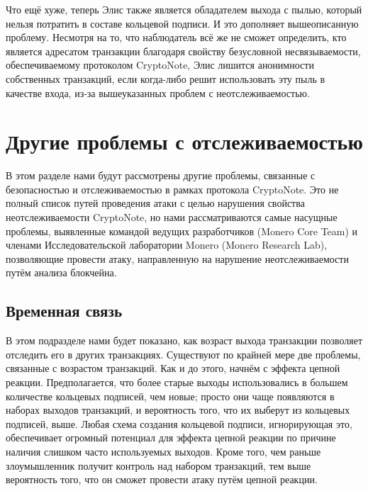 \documentclass{mrl}
\begin{document}
Что ещё хуже, теперь Элис также является обладателем выхода с пылью, который нельзя потратить в составе кольцевой подписи. И это дополняет вышеописанную проблему. Несмотря на то, что наблюдатель всё же не сможет определить, кто является адресатом транзакции благодаря свойству безусловной несвязываемости, обеспечиваемому протоколом CryptoNote, Элис лишится анонимности собственных транзакций, если когда-либо решит использовать эту пыль в качестве входа, из-за вышеуказанных проблем с неотслеживаемостью.

\section{Другие проблемы с отслеживаемостью}\label{moreIssues}
В этом разделе нами будут рассмотрены другие проблемы, связанные с безопасностью и отслеживаемостью в рамках протокола CryptoNote. Это не полный список путей проведения атаки с целью нарушения свойства неотслеживаемости CryptoNote, но нами рассматриваются самые насущные проблемы, выявленные командой ведущих разработчиков (Monero Core Team) и членами Исследовательской лаборатории Monero (Monero Research Lab), позволяющие провести атаку, направленную на нарушение неотслеживаемости путём анализа блокчейна.

\subsection{Временная связь}\label{temporalAssociations}

В этом подразделе нами будет показано, как возраст выхода транзакции позволяет отследить его в других транзакциях. Существуют по крайней мере две проблемы, связанные с возрастом транзакций. Как и до этого, начнём с эффекта цепной реакции. Предполагается, что более старые выходы использовались в большем количестве кольцевых подписей, чем новые; просто они чаще появляются в наборах выходов транзакций, и вероятность того, что их выберут из кольцевых подписей, выше. Любая схема создания кольцевой подписи, игнорирующая это, обеспечивает огромный потенциал для эффекта цепной реакции по причине наличия слишком часто используемых выходов. Кроме того, чем раньше злоумышленник получит контроль над набором транзакций, тем выше вероятность того, что он сможет провести атаку путём цепной реакции.
\end{document}
